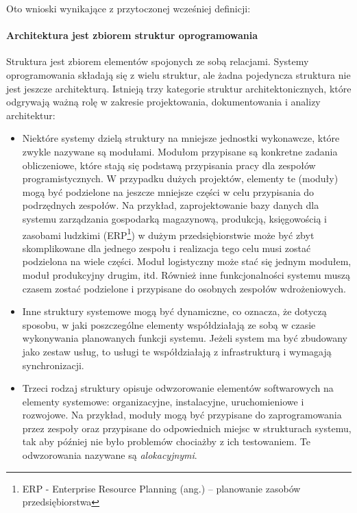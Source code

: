 Oto wnioski wynikające z przytoczonej wcześniej definicji:

\paragraph{Architektura jest zbiorem struktur oprogramowania}

Struktura jest zbiorem elementów spojonych ze sobą relacjami. Systemy oprogramowania składają się z wielu struktur, ale żadna pojedyncza struktura nie jest jeszcze architekturą. Istnieją trzy kategorie struktur architektonicznych, które odgrywają ważną rolę w zakresie projektowania, dokumentowania i analizy architektur:
\begin{itemize}
\item
Niektóre systemy dzielą struktury na mniejsze jednostki wykonawcze, które zwykle nazywane są modułami. Modułom przypisane są konkretne zadania obliczeniowe, które stają się podstawą przypisania pracy dla zespołów programistycznych. W przypadku dużych projektów, elementy te (moduły) mogą być podzielone na jeszcze mniejsze części w celu przypisania do podrzędnych zespołów. Na przykład, zaprojektowanie bazy danych dla systemu zarządzania gospodarką magazynową, produkcją, księgowością i zasobami ludzkimi (ERP\footnote{ERP - Enterprise Resource Planning (ang.) – planowanie zasobów przedsiębiorstwa}) w dużym przedsiębiorstwie może być zbyt skomplikowane dla jednego zespołu i realizacja tego celu musi zostać podzielona na wiele części. Moduł logistyczny może stać się jednym modułem, moduł produkcyjny drugim, itd. Również inne funkcjonalności systemu muszą czasem zostać podzielone i przypisane do osobnych zespołów wdrożeniowych.
\item
Inne struktury systemowe mogą być dynamiczne, co oznacza, że dotyczą sposobu, w jaki poszczególne elementy współdziałają ze sobą w czasie wykonywania planowanych funkcji systemu. Jeżeli system ma być zbudowany jako zestaw usług, to usługi te współdziałają z infrastrukturą i wymagają synchronizacji. 

\item
Trzeci rodzaj struktury opisuje odwzorowanie elementów softwarowych na elementy systemowe: organizacyjne, instalacyjne, uruchomieniowe i rozwojowe. Na przykład, moduły mogą być przypisane do zaprogramowania przez zespoły oraz przypisane do odpowiednich miejsc w strukturach systemu, tak aby później nie było problemów chociażby z ich testowaniem.
Te odwzorowania nazywane są \textit{alokacyjnymi}.

\end{itemize}

